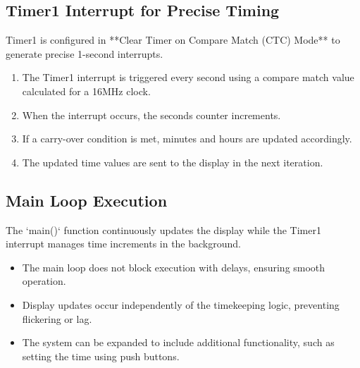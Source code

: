 \subsection{Timer1 Interrupt for Precise Timing}
Timer1 is configured in **Clear Timer on Compare Match (CTC) Mode** to generate precise 1-second interrupts.

\begin{enumerate}
    \item The Timer1 interrupt is triggered every second using a compare match value calculated for a 16MHz clock.
    \item When the interrupt occurs, the seconds counter increments.
    \item If a carry-over condition is met, minutes and hours are updated accordingly.
    \item The updated time values are sent to the display in the next iteration.
\end{enumerate}

\subsection{Main Loop Execution}
The `main()` function continuously updates the display while the Timer1 interrupt manages time increments in the background.

\begin{itemize}
    \item The main loop does not block execution with delays, ensuring smooth operation.
    \item Display updates occur independently of the timekeeping logic, preventing flickering or lag.
    \item The system can be expanded to include additional functionality, such as setting the time using push buttons.
\end{itemize}
